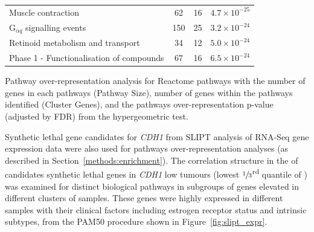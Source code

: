 \begin{table}[!hp]
{\begin{threeparttable}
\begin{tabular}{lccc}
  \rowcolor{Cluster_Red!20} 
  Muscle contraction &  62 &  16 & $4.7 \times 10^{-25}$ \\
  \rowcolor{Cluster_Red!15} 
  G$_{\alpha q}$ signalling events & 150 &  25 & $3.2 \times 10^{-24}$ \\
  \rowcolor{Cluster_Red!20} 
  Retinoid metabolism and transport &  34 &  12 & $5.0 \times 10^{-24}$ \\
  \rowcolor{Cluster_Red!15} 
  Phase 1 - Functionalisation of compounds &  67 &  16 & $6.5 \times 10^{-24}$ \\
  \hline
\end{tabular}
\begin{tablenotes}
\raggedright %
Pathway over-representation analysis for Reactome \glspl{pathway} with the number of genes in each \glspl{pathway} (Pathway Size), number of genes within the \glspl{pathway} identified (Cluster Genes), and the \glspl{pathway} over-representation p-value (adjusted by \gls{FDR}) from the hypergeometric test.  
\end{tablenotes}
\end{threeparttable}
}
\end{table}

Synthetic lethal gene candidates for \textit{CDH1} from \gls{SLIPT} analysis of \gls{RNA-Seq} \gls{gene expression} data were also used for \glspl{pathway} over-representation analyses (as described in Section~\ref{methods:enrichment}). The correlation structure in the  of candidates \gls{synthetic lethal} genes in \textit{CDH1} low tumours (lowest $\sfrac{1}{3}$\textsuperscript{rd} quantile of ) was examined for distinct biological \glspl{pathway} in subgroups of genes elevated in different clusters of samples. These genes were highly expressed in different samples with their clinical factors including estrogen receptor status and \glspl{intrinsic subtype}, from the \gls{PAM50} procedure \citep{Parker2009} shown in Figure~\ref{fig:slipt_expr}.

